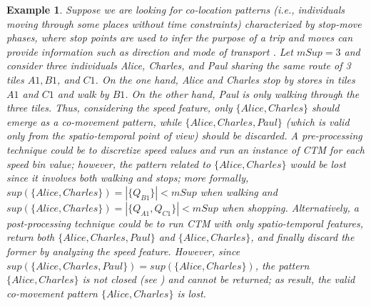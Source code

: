 \documentclass[
]{ceurart}
\newtheorem{example}{Example}
\begin{document}
\begin{example}
Suppose we are looking for co-location patterns (i.e., individuals moving through some places without time constraints) characterized by stop-move phases, where stop points are used to infer the purpose of a trip and moves can provide information such as direction and mode of transport \citep{DBLP:journals/tgis/WangM18}.
Let $mSup=3$ and consider three individuals Alice, Charles, and Paul sharing the same route of 3 tiles $A1,B1$, and $C1$.
On the one hand, Alice and Charles stop by stores in tiles $A1$ and $C1$ and walk by $B1$. On the other hand, Paul is only walking through the three tiles. Thus, considering the speed feature, only $\{Alice, Charles\}$ should emerge as a co-movement pattern, while $\{Alice, Charles, Paul\}$ (which is valid only from the spatio-temporal point of view) should be discarded.
A pre-processing technique could be to discretize speed values and run an instance of CTM for each speed bin value; however, the pattern related to $\{Alice, Charles\}$ would be lost since it involves \textit{both} walking and stops; more formally, $sup(\{Alice, Charles\})=|\{Q_{B1}\}|<mSup$ when walking and $sup(\{Alice, Charles\})=|\{Q_{A1},Q_{C1}\}|<mSup$ when shopping.
Alternatively, a post-processing technique could be to run CTM with only spatio-temporal features, return both $\{Alice, Charles, Paul\}$ and $\{Alice, Charles\}$, and finally discard the former by analyzing the speed feature. However, since $sup(\{Alice, Charles, Paul\})=sup(\{Alice, Charles\})$, the pattern $\{Alice, Charles\}$ is not closed (see ) and cannot be returned; as result, the valid co-movement pattern $\{Alice, Charles\}$ is lost.
\end{example}
\end{document}
